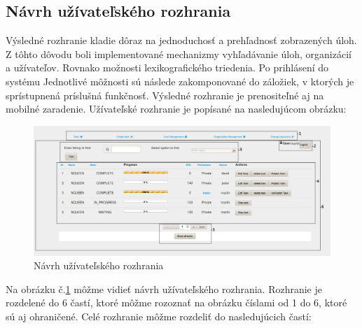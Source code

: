 \subsection{Návrh užívateľského rozhrania}
Výsledné rozhranie kladie dôraz na jednoduchosť a prehľadnosť zobrazených úloh. Z tôhto dôvodu boli implementované mechanizmy vyhľadávanie úloh, organizácií a užívateľov. Rovnako možnosti lexikografického triedenia. Po prihlásení do systému Jednotlivé môžnosti sú následe zakomponované do záložiek, v ktorých je sprístupnená príslušná funkčnosť. Výsledné rozhranie je prenositeľné aj na mobilné zaradenie. Užívateľské rozhranie je popísané na nasledujúcom obrázku:
\begin{figure}[htb]

\begin{center}

\includegraphics[scale=0.4]{page.jpg} 
\caption{Návrh užívateľského rozhrania}
\label{rozhranie}

\end{center}

\end{figure}
Na obrázku č.\ref{rozhranie} môžme vidieť návrh užívateľského rozhrania. Rozhranie je rozdelené do 6 častí, ktoré môžme rozoznať na obrázku číslami od 1 do 6, ktoré sú aj ohraničené. Celé rozhranie môžme rozdeliť do nasledujúcich častí:
